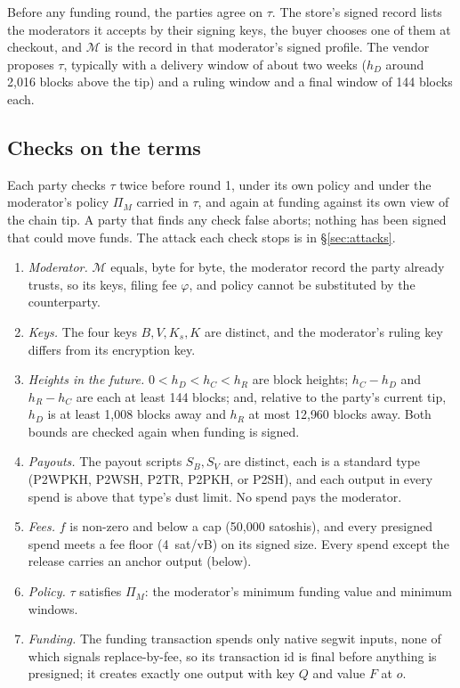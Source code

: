 Before any funding round, the parties agree on $\tau$. The store's signed record lists the moderators it accepts by their signing keys, the buyer chooses one of them at checkout, and $\mathcal{M}$ is the record in that moderator's signed profile. The vendor proposes $\tau$, typically with a delivery window of about two weeks ($h_D$ around 2{,}016 blocks above the tip) and a ruling window and a final window of 144 blocks each.

\subsection{Checks on the terms}
\label{sec:escrow-checks}

Each party checks $\tau$ twice before round 1, under its own policy and under the moderator's policy $\Pi_M$ carried in $\tau$, and again at funding against its own view of the chain tip. A party that finds any check false aborts; nothing has been signed that could move funds. The attack each check stops is in \S\ref{sec:attacks}.
\begin{enumerate}[label=(C\arabic*),leftmargin=2.6em]
  \item \emph{Moderator.} $\mathcal{M}$ equals, byte for byte, the moderator record the party already trusts, so its keys, filing fee $\varphi$, and policy cannot be substituted by the counterparty.
  \item \emph{Keys.} The four keys $B,V,K_s,K$ are distinct, and the moderator's ruling key differs from its encryption key.
  \item \emph{Heights in the future.} $0<h_D<h_C<h_R$ are block heights; $h_C-h_D$ and $h_R-h_C$ are each at least 144 blocks; and, relative to the party's current tip, $h_D$ is at least 1{,}008 blocks away and $h_R$ at most 12{,}960 blocks away. Both bounds are checked again when funding is signed.
  \item \emph{Payouts.} The payout scripts $S_B,S_V$ are distinct, each is a standard type (P2WPKH, P2WSH, P2TR, P2PKH, or P2SH), and each output in every spend is above that type's dust limit. No spend pays the moderator.
  \item \emph{Fees.} $f$ is non-zero and below a cap (50{,}000 satoshis), and every presigned spend meets a fee floor (4~sat/vB) on its signed size. Every spend except the release carries an anchor output (below).
  \item \emph{Policy.} $\tau$ satisfies $\Pi_M$: the moderator's minimum funding value and minimum windows.
  \item \emph{Funding.} The funding transaction spends only native segwit inputs, none of which signals replace-by-fee, so its transaction id is final before anything is presigned; it creates exactly one output with key $Q$ and value $F$ at $o$.
\end{enumerate}

